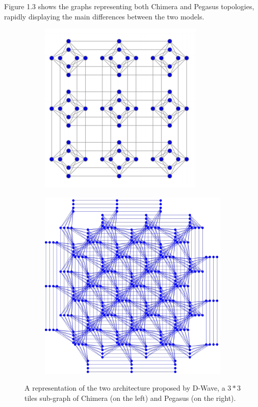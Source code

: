 Figure 1.3 shows the graphs representing both Chimera and Pegasus topologies, rapidly displaying the main differences between the two models. 
\begin{figure}[t]
    \begin{subfigure}{.5\textwidth}
        \centering
	    \includegraphics{images/QATile.PNG}
    \end{subfigure}
    \begin{subfigure}{.5\textwidth}
        \begin{center}
	    \includegraphics[width=\textwidth]{images/Pegas.PNG}
	    \end{center}
	\end{subfigure}
	\caption{A representation of the two architecture proposed by D-Wave, a $3*3$ tiles sub-graph of Chimera (on the left) and Pegasus (on the right).}
\end{figure}

\newpage


